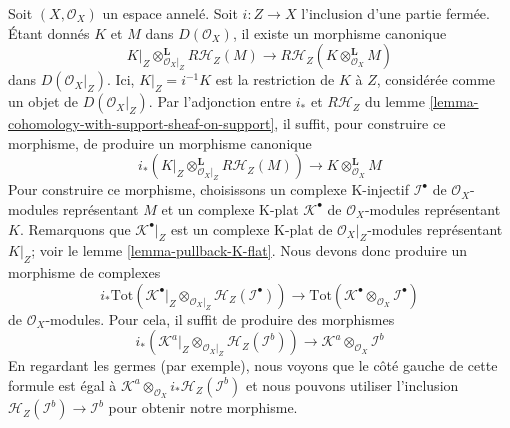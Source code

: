 \begin{remark}

\label{remark-support-cup-product}

Soit $(X, \mathcal{O}_X)$ un espace annelé. Soit $i : Z \to X$
l'inclusion d'une partie fermée. Étant donnés $K$ et $M$ dans
$D(\mathcal{O}_X)$, il existe un morphisme canonique
$$
K|_Z \otimes_{\mathcal{O}_X|_Z}^\mathbf{L} R\mathcal{H}_Z(M)
\longrightarrow
R\mathcal{H}_Z(K \otimes_{\mathcal{O}_X}^\mathbf{L} M)
$$
dans $D(\mathcal{O}_X|_Z)$. Ici, $K|_Z = i^{-1}K$ est la restriction de
$K$ à $Z$, considérée comme un objet de $D(\mathcal{O}_X|_Z)$. Par l'adjonction entre $i_*$ et $R\mathcal{H}_Z$ du lemme \ref{lemma-cohomology-with-support-sheaf-on-support}, il suffit, pour construire ce morphisme, de produire un morphisme canonique
$$
i_*\left(K|_Z \otimes_{\mathcal{O}_X|_Z}^\mathbf{L} R\mathcal{H}_Z(M)\right)
\longrightarrow
K \otimes_{\mathcal{O}_X}^\mathbf{L} M
$$
Pour construire ce morphisme, choisissons un complexe K-injectif $\mathcal{I}^\bullet$
de $\mathcal{O}_X$-modules représentant $M$ et un complexe K-plat
$\mathcal{K}^\bullet$ de $\mathcal{O}_X$-modules représentant $K$. Remarquons que $\mathcal{K}^\bullet|_Z$ est un complexe K-plat de
$\mathcal{O}_X|_Z$-modules représentant $K|_Z$; voir le lemme \ref{lemma-pullback-K-flat}. Nous devons donc produire un morphisme de complexes
$$
i_*\text{Tot}\left(
\mathcal{K}^\bullet|_Z \otimes_{\mathcal{O}_X|_Z}
\mathcal{H}_Z(\mathcal{I}^\bullet)\right)
\longrightarrow
\text{Tot}(\mathcal{K}^\bullet \otimes_{\mathcal{O}_X} \mathcal{I}^\bullet)
$$
de $\mathcal{O}_X$-modules. Pour cela, il suffit de produire des morphismes
$$
i_*(\mathcal{K}^a|_Z \otimes_{\mathcal{O}_X|_Z}
\mathcal{H}_Z(\mathcal{I}^b))
\longrightarrow
\mathcal{K}^a \otimes_{\mathcal{O}_X} \mathcal{I}^b
$$
En regardant les germes (par exemple), nous voyons que le côté gauche de cette formule est égal à
$\mathcal{K}^a \otimes_{\mathcal{O}_X} i_*\mathcal{H}_Z(\mathcal{I}^b)$
et nous pouvons utiliser l'inclusion
$\mathcal{H}_Z(\mathcal{I}^b) \to \mathcal{I}^b$ pour obtenir notre morphisme.

\end{remark}

